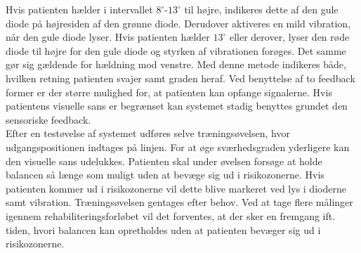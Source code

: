  Hvis patienten hælder i intervallet $8^{\circ}$-$13^{\circ}$ til højre, indikeres dette af den gule diode på højresiden af den grønne diode. Derudover aktiveres en mild vibration, når den gule diode lyser. Hvis patienten hælder $13^{\circ}$ eller derover, lyser den røde diode til højre for den gule diode og styrken af vibrationen forøges. Det samme gør sig gældende for hældning mod venstre. Med denne metode indikeres både, hvilken retning patienten svajer samt graden heraf. Ved benyttelse af to feedback former er der større mulighed for, at patienten kan opfange signalerne. Hvis patientens visuelle sans er begrænset kan systemet stadig benyttes grundet den sensoriske feedback. \\ 
Efter en testøvelse af systemet udføres selve træningsøvelsen, hvor udgangspositionen indtages på linjen. For at øge sværhedsgraden yderligere kan den visuelle sans udelukkes. Patienten skal under øvelsen forsøge at holde balancen så længe som muligt uden at bevæge sig ud i risikozonerne. Hvis patienten kommer ud i risikozonerne vil dette blive markeret ved lys i dioderne samt vibration. Træningsøvelsen gentages efter behov. Ved at tage flere målinger igennem rehabiliteringsforløbet vil det forventes, at der sker en fremgang ift. tiden, hvori balancen kan opretholdes uden at patienten bevæger sig ud i risikozonerne. 




